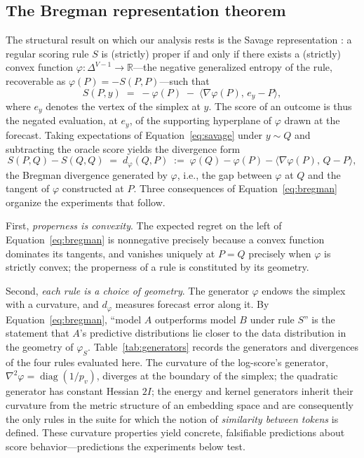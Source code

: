 \documentclass{article}
\newcommand{\simplex}{\Delta^{V-1}}
\begin{document}
\subsection{The Bregman representation theorem}
\label{sec:bregman}

The structural result on which our analysis rests is the Savage representation
\citep{gneiting2007}: a regular scoring rule $S$ is (strictly) proper if and only if
there exists a (strictly) convex function $\varphi : \simplex \to \mathbb{R}$---the
negative generalized entropy of the rule, recoverable as $\varphi(P) = -S(P,P)$---such
that
\begin{equation}
  S(P, y) \;=\; -\varphi(P) \;-\; \big\langle \nabla\varphi(P),\, e_y - P \big\rangle ,
  \label{eq:savage}
\end{equation}
where $e_y$ denotes the vertex of the simplex at $y$. The score of an outcome is thus the
negated evaluation, at $e_y$, of the supporting hyperplane of $\varphi$ drawn at the
forecast. Taking expectations of Equation~\eqref{eq:savage} under $y \sim Q$ and
subtracting the oracle score yields the divergence form
\begin{equation}
  S(P, Q) - S(Q, Q) \;=\; d_\varphi(Q, P)
  \;:=\; \varphi(Q) - \varphi(P) - \langle \nabla\varphi(P),\, Q - P\rangle ,
  \label{eq:bregman}
\end{equation}
the Bregman divergence generated by $\varphi$, i.e., the gap between $\varphi$ at $Q$ and
the tangent of $\varphi$ constructed at $P$. Three consequences of
Equation~\eqref{eq:bregman} organize the experiments that follow.

First, \emph{properness is convexity}. The expected regret on the left of
Equation~\eqref{eq:bregman} is nonnegative precisely because a convex function dominates
its tangents, and vanishes uniquely at $P = Q$ precisely when $\varphi$ is strictly
convex; the properness of a rule is constituted by its geometry.

Second, \emph{each rule is a choice of geometry}. The generator $\varphi$ endows the
simplex with a curvature, and $d_\varphi$ measures forecast error along it. By
Equation~\eqref{eq:bregman}, ``model $A$ outperforms model $B$ under rule $S$'' is
the statement that $A$'s predictive distributions lie closer
to the data distribution in the geometry of $\varphi_S$. Table~\ref{tab:generators}
records the generators and divergences of the four rules evaluated here. The curvature of
the log-score's generator, $\nabla^2\varphi = \operatorname{diag}(1/p_v)$, diverges at
the boundary of the simplex; the quadratic generator has constant Hessian $2I$; the
energy and kernel generators inherit their curvature from the metric structure of an
embedding space and are consequently the only rules in the suite for which the notion of
\emph{similarity between tokens} is defined. These curvature properties yield concrete,
falsifiable predictions about score behavior---predictions the experiments below test.
\end{document}
